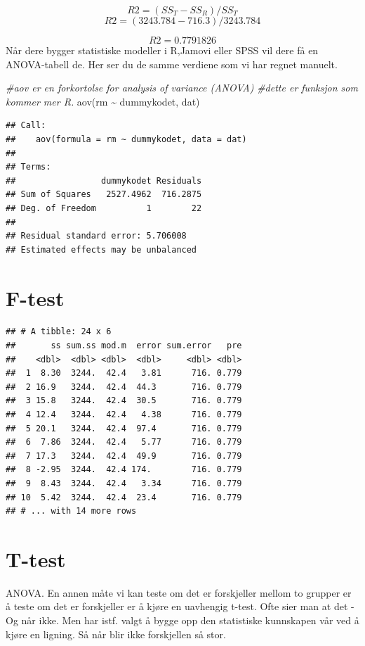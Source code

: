\documentclass[
]{book}
\newenvironment{Shaded}{\begin{snugshade}}{\end{snugshade}}
\newcommand{\CommentTok}[1]{\textcolor[rgb]{0.56,0.35,0.01}{\textit{#1}}}
\newcommand{\FunctionTok}[1]{\textcolor[rgb]{0.00,0.00,0.00}{#1}}
\newcommand{\NormalTok}[1]{#1}
\newcommand{\SpecialCharTok}[1]{\textcolor[rgb]{0.00,0.00,0.00}{#1}}
\begin{document}
\[
R2 = (SS_T - SS_R) / SS_T
\]
\[
R2 = (3243.784 - 716.3) / 3243.784 
\]

\[
R2 = 0.7791826
\]
Når dere bygger statistiske modeller i R,Jamovi eller SPSS vil dere få en ANOVA-tabell de. Her ser du de samme verdiene som vi har regnet manuelt.

\begin{Shaded}
\begin{Highlighting}[]
\CommentTok{\#aov er en forkortolse for analysis of variance (ANOVA)}
\CommentTok{\#dette er funksjon som kommer mer R.}
\FunctionTok{aov}\NormalTok{(rm }\SpecialCharTok{\textasciitilde{}}\NormalTok{ dummykodet, dat)}
\end{Highlighting}
\end{Shaded}

\begin{verbatim}
## Call:
##    aov(formula = rm ~ dummykodet, data = dat)
## 
## Terms:
##                 dummykodet Residuals
## Sum of Squares   2527.4962  716.2875
## Deg. of Freedom          1        22
## 
## Residual standard error: 5.706008
## Estimated effects may be unbalanced
\end{verbatim}

\hypertarget{f-test}{%
\section{F-test}\label{f-test}}

\begin{verbatim}
## # A tibble: 24 x 6
##       ss sum.ss mod.m  error sum.error   pre
##    <dbl>  <dbl> <dbl>  <dbl>     <dbl> <dbl>
##  1  8.30  3244.  42.4   3.81      716. 0.779
##  2 16.9   3244.  42.4  44.3       716. 0.779
##  3 15.8   3244.  42.4  30.5       716. 0.779
##  4 12.4   3244.  42.4   4.38      716. 0.779
##  5 20.1   3244.  42.4  97.4       716. 0.779
##  6  7.86  3244.  42.4   5.77      716. 0.779
##  7 17.3   3244.  42.4  49.9       716. 0.779
##  8 -2.95  3244.  42.4 174.        716. 0.779
##  9  8.43  3244.  42.4   3.34      716. 0.779
## 10  5.42  3244.  42.4  23.4       716. 0.779
## # ... with 14 more rows
\end{verbatim}

\hypertarget{t-test}{%
\section{T-test}\label{t-test}}

ANOVA. En annen måte vi kan teste om det er forskjeller mellom to grupper er å teste om det er forskjeller er å kjøre en uavhengig t-test. Ofte sier man at det - Og når ikke. Men har istf. valgt å bygge opp den statistiske kunnskapen vår ved å kjøre en ligning. Så når blir ikke forskjellen så stor.
\end{document}
